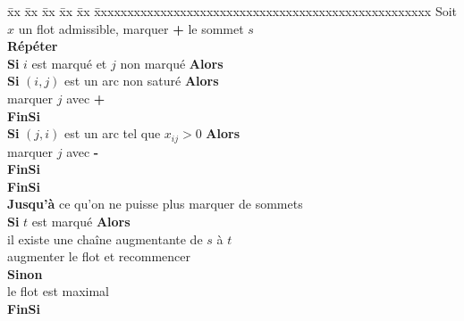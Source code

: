 \begin{tabbing}
    \= xx \= xx \= xx \= xx \= xx \=
    xxxxxxxxxxxxxxxxxxxxxxxxxxxxxxxxxxxxxxxxxxxxxxxxxxx\kill
    \> Soit $x$ un flot admissible, marquer \textbf{+} le sommet $s$ \\
    \> \textbf{Répéter} \\
    \> \> \textbf{Si} $i$ est marqué et $j$ non marqué \textbf{Alors} \\
    \> \> \> \textbf{Si} $(i,j)$ est un arc non saturé \textbf{Alors} \\
    \> \> \> \> marquer $j$ avec \textbf{+} \\
    \> \> \> \textbf{FinSi} \\
    \> \> \> \textbf{Si} $(j,i)$ est un arc tel que $x_{ij} > 0$  \textbf{Alors} \\
    \> \> \> \> marquer $j$ avec \textbf{-} \\
    \> \> \> \textbf{FinSi} \\
    \> \> \textbf{FinSi} \\
    \> \textbf{Jusqu'à} ce qu'on ne puisse plus marquer de sommets \\
    \> \textbf{Si} $t$ est marqué \textbf{Alors} \\
    \> \> il existe une chaîne augmentante de $s$ à $t$ \\
    \> \> augmenter le flot et recommencer \\
    \> \textbf{Sinon} \\
    \> \> le flot est maximal \\
    \> \textbf{FinSi} \\
  \end{tabbing}

  
